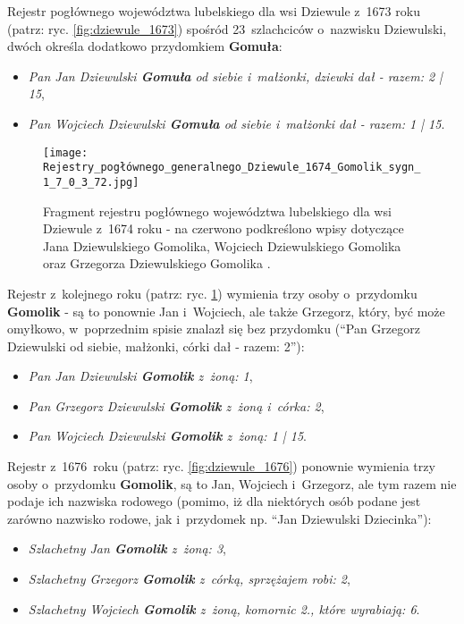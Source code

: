 Rejestr pogłównego województwa lubelskiego dla wsi Dziewule z~1673 roku 
(patrz: ryc. \ref{fig:dziewule_1673}) spośród 23~szlachciców o~nazwisku 
Dziewulski, dwóch określa dodatkowo przydomkiem \textbf{Gomuła}:
\begin{itemize}
\item \textit{Pan Jan Dziewulski \textbf{Gomuła} od siebie i~małżonki, 
dziewki dał - razem: 2 | 15},
\item \textit{Pan Wojciech Dziewulski \textbf{Gomuła} od siebie i~małżonki 
dał - razem: 1 | 15}.
\end{itemize}

\begin{figure}[!ht]
    \vspace*{0.5cm}
    \centering \texttt{[image: 
        Rejestry\_pogłównego\_generalnego\_Dziewule\_1674\_Gomolik\_sygn\_1\_7\_0\_3\_72.jpg]}
    \captionsetup{format=hang}
    \caption{Fragment rejestru pogłównego województwa lubelskiego dla wsi 
    Dziewule z~1674 roku - na czerwono podkreślono wpisy dotyczące Jana 
    Dziewulskiego Gomolika, Wojciech Dziewulskiego Gomolika oraz Grzegorza 
    Dziewulskiego Gomolika \cite{agad1}.}
    \label{fig:dziewule_1674}
\end{figure}

Rejestr z~kolejnego roku (patrz: ryc. \ref{fig:dziewule_1674}) wymienia trzy 
osoby o~przydomku \textbf{Gomolik} - są to ponownie Jan i~Wojciech, ale także 
Grzegorz, który, być może omyłkowo, w~poprzednim spisie znalazł się bez 
przydomku (\enquote{Pan Grzegorz Dziewulski od siebie, małżonki, córki dał - 
razem: 2}):
\begin{itemize}
\item \textit{Pan Jan Dziewulski \textbf{Gomolik} z~żoną: 1},
\item \textit{Pan Grzegorz Dziewulski \textbf{Gomolik} z~żoną i~córka: 2},
\item \textit{Pan Wojciech Dziewulski \textbf{Gomolik} z~żoną: 1 | 15}.
\end{itemize}

Rejestr z~1676~roku (patrz: ryc. \ref{fig:dziewule_1676}) ponownie wymienia 
trzy osoby o~przydomku \textbf{Gomolik}, są to Jan, Wojciech i~Grzegorz, ale 
tym razem nie podaje ich nazwiska rodowego (pomimo, iż dla niektórych osób 
podane jest zarówno nazwisko rodowe, jak i~przydomek np. \enquote{Jan 
Dziewulski Dziecinka}):

\begin{itemize}
\item \textit{Szlachetny Jan \textbf{Gomolik} z~żoną: 3},
\item \textit{Szlachetny Grzegorz \textbf{Gomolik} z~córką, 
sprzężajem robi: 2},
\item \textit{Szlachetny Wojciech \textbf{Gomolik} z~żoną, komornic 2., 
które wyrabiają: 6}.
\end{itemize}

